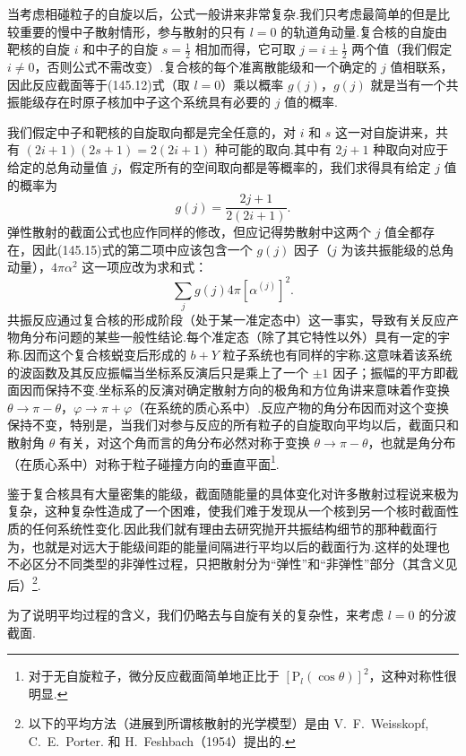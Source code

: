 当考虑相碰粒子的自旋以后，公式一般讲来非常复杂.我们只考虑最简单的但是比较重要的慢中子散射情形，参与散射的只有 $l=0$ 的轨道角动量.复合核的自旋由靶核的自旋 $i$ 和中子的自旋 $s=\frac{1}{2}$ 相加而得，它可取 $j=i\pm\frac{1}{2}$ 两个值（我们假定 $i\neq0$，否则公式不需改变）.复合核的每个准离散能级和一个确定的 $j$ 值相联系，因此反应截面等于(145.12)式（取 $l=0$）乘以概率 $g(j)$，$g(j)$ 就是当有一个共振能级存在时原子核加中子这个系统具有必要的 $j$ 值的概率.

我们假定中子和靶核的自旋取向都是完全任意的，对 $i$ 和 $s$ 这一对自旋讲来，共有 $(2i+1)(2s+1)=2(2i+1)$ 种可能的取向.其中有 $2j+1$ 种取向对应于给定的总角动量值 $j$，假定所有的空间取向都是等概率的，我们求得具有给定 $j$ 值的概率为
\begin{equation}
  g(j)=\frac{2j+1}{2(2i+1)}.
\end{equation}
弹性散射的截面公式也应作同样的修改，但应记得势散射中这两个 $j$ 值全都存在，因此(145.15)式的第二项中应该包含一个 $g(j)$ 因子（$j$ 为该共振能级的总角动量），$4\pi\alpha^2$ 这一项应改为求和式：
\begin{equation*}
  \sum_jg(j)4\pi\left[\alpha^{(j)}\right]^2.
\end{equation*}
共振反应通过复合核的形成阶段（处于某一准定态中）这一事实，导致有关反应产物角分布问题的某些一般性结论.每个准定态（除了其它特性以外）具有一定的宇称.因而这个复合核蜕变后形成的 $b+Y$ 粒子系统也有同样的宇称.这意味着该系统的波函数及其反应振幅当坐标系反演后只是乘上了一个 $\pm1$ 因子；振幅的平方即截面因而保持不变.坐标系的反演对确定散射方向的极角和方位角讲来意味着作变换 $\theta\to\pi-\theta$，$\varphi\to\pi+\varphi$（在系统的质心系中）.反应产物的角分布因而对这个变换保持不变，特别是，当我们对参与反应的所有粒子的自旋取向平均以后，截面只和散射角 $\theta$ 有关，对这个角而言的角分布必然对称于变换 $\theta\to\pi-\theta$，也就是角分布（在质心系中）对称于粒子碰撞方向的垂直平面\footnote{对于无自旋粒子，微分反应截面简单地正比于 $\left[\mathrm{P}_l(\cos\theta)\right]^2$，这种对称性很明显.}.

鉴于复合核具有大量密集的能级，截面随能量的具体变化对许多散射过程说来极为复杂，这种复杂性造成了一个困难，使我们难于发现从一个核到另一个核时截面性质的任何系统性变化.因此我们就有理由去研究抛开共振结构细节的那种截面行为，也就是对远大于能级间距的能量间隔进行平均以后的截面行为.这样的处理也不必区分不同类型的非弹性过程，只把散射分为“弹性”和“非弹性”部分（其含义见后）\footnote{以下的平均方法（进展到所谓核散射的光学模型）是由 V.~F.~Weisskopf, C.~E.~Porter. 和 H.~Feshbach（1954）提出的.}.

为了说明平均过程的含义，我们仍略去与自旋有关的复杂性，来考虑 $l=0$ 的分波截面.

